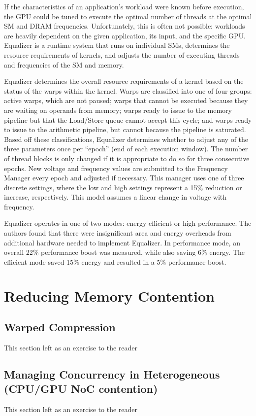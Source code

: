\documentclass[prodmode,acmtecs]{acmsmall} %
\begin{document}
If the characteristics of an application's workload were known before execution,
the GPU could be tuned to execute the optimal number of threads at the optimal
SM and DRAM frequencies. Unfortunately, this is often not possible: workloads
are heavily dependent on the given application, its input, and the specific GPU.
Equalizer \cite{EqualizerTuningOfResources} is a runtime system that runs on
individual SMs, determines the resource requirements of kernels, and adjusts the
number of executing threads and frequencies of the SM and memory.

Equalizer determines the overall resource requirements of a kernel based on the
status of the warps within the kernel. Warps are classified into one of four
groups: active warps, which are not paused; warps that cannot be executed
because they are waiting on operands from memory; warps ready to issue to the
memory pipeline but that the Load/Store queue cannot accept this cycle; and
warps ready to issue to the arithmetic pipeline, but cannot because the pipeline
is saturated. Based off these classifications, Equalizer determines whether to
adjust any of the three parameters once per ``epoch'' (end of each execution
window). The number of thread blocks is only changed if it is appropriate to do
so for three consecutive epochs. New voltage and frequency values are submitted
to the Frequency Manager every epoch and adjusted if necessary. This manager
uses one of three discrete settings, where the low and high settings represent a
15\% reduction or increase, respectively. This model assumes a linear change in
voltage with frequency.

Equalizer operates in one of two modes: energy efficient or high performance.
The authors found that there were insignificant area and energy overheads from
additional hardware needed to implement Equalizer. In performance mode, an
overall 22\% performance boost was measured, while also saving 6\% energy. The
efficient mode saved 15\% energy and resulted in a 5\% performance boost.

\section{Reducing Memory Contention} \label{sec:memory}
\subsection{Warped Compression}
This section left as an exercise to the reader

\subsection{Managing Concurrency in Heterogeneous (CPU/GPU NoC contention)}
This section left as an exercise to the reader
\end{document}
